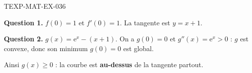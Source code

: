 \begin{corrige}{TEXP-MAT-EX-036}

\textbf{Question 1.} $f(0) = 1$ et $f'(0) = 1$. La tangente est $y = x + 1$.


\textbf{Question 2.} $g(x) = \mathrm{e}^x - (x+1)$. On a $g(0)=0$ et $g''(x) = \mathrm{e}^x > 0$ : $g$ est convexe, donc son minimum $g(0)=0$ est global.

Ainsi $g(x) \geq 0$ : la courbe est \textbf{au-dessus} de la tangente partout.

\end{corrige}
